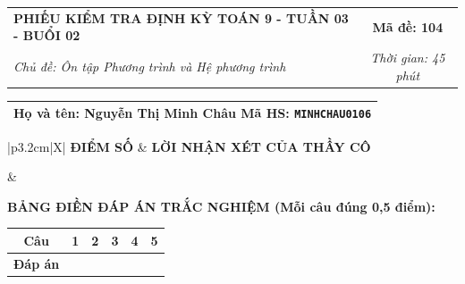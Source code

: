 \documentclass[12pt,a4paper]{article}
\begin{document}
\newpage


\noindent
\begin{tabularx}{\linewidth}{|X|c|}
\hline
\textbf{PHIẾU KIỂM TRA ĐỊNH KỲ TOÁN 9 - TUẦN 03 - BUỔI 02} & \textbf{Mã đề: 104} \\
\textit{Chủ đề: Ôn tập Phương trình và Hệ phương trình} & \textit{Thời gian: 45 phút} \\
\hline
\end{tabularx}

\vspace{1mm}

\noindent
\begin{tabularx}{\linewidth}{|X|}
\hline
\rule[-2mm]{0pt}{7.5mm}\textbf{Họ và tên:} \textbf{\large Nguyễn Thị Minh Châu} \hfill \textbf{Mã HS:} \texttt{MINHCHAU0106} \quad \\
\hline
\end{tabularx}

\vspace{1mm}

\noindent
\begin{tabularx}{\linewidth}{|p{3.2cm}|X|}
\hline
\centering\textbf{ĐIỂM SỐ} & \centering\textbf{LỜI NHẬN XÉT CỦA THẦY CÔ} \tabularnewline
\hline
\rule{0pt}{1.3cm} & \tabularnewline
\hline
\end{tabularx}

\vspace{1.2mm}

\noindent\textbf{BẢNG ĐIỀN ĐÁP ÁN TRẮC NGHIỆM (Mỗi câu đúng 0,5 điểm):}
\vspace{0.8mm}

\noindent
\renewcommand{\arraystretch}{1.35}
\begin{tabularx}{\linewidth}{|c|*{5}{>{\centering\arraybackslash}X|}}
\hline
\textbf{Câu} & \textbf{1} & \textbf{2} & \textbf{3} & \textbf{4} & \textbf{5} \\
\hline
\textbf{Đáp án} & & & & & \\
\hline
\end{tabularx}
\renewcommand{\arraystretch}{1.0}

\vspace{1.5mm}
\end{document}
